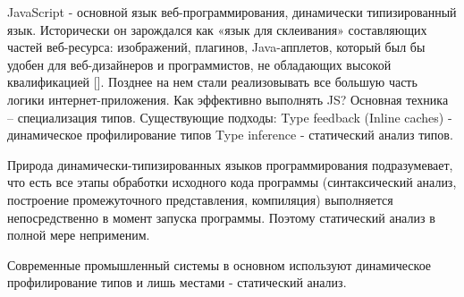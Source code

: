 \documentclass{article}
\begin{document}
JavaScript - основной язык веб-программирования, динамически типизированный язык.
Исторически он зарождался как «язык для склеивания» составляющих частей веб-ресурса: изображений, плагинов, Java-апплетов, который был бы удобен для веб-дизайнеров и программистов, не обладающих высокой квалификацией []. Позднее на нем стали реализовывать все большую часть логики интернет-приложения. Как эффективно выполнять JS? 
Основная техника – специализация типов.
Существующие подходы:
Type feedback (Inline caches) - динамическое профилирование типов
Type inference - статический анализ типов.

Природа динамически-типизированных языков программирования подразумевает, что есть все этапы обработки исходного кода программы (синтаксический анализ, построение промежуточного представления, компиляция) выполняется непосредственно в момент запуска программы. Поэтому статический анализ в полной мере неприменим.

Современные промышленный системы в основном используют динамическое профилирование типов и лишь местами - статический анализ.
\end{document}
